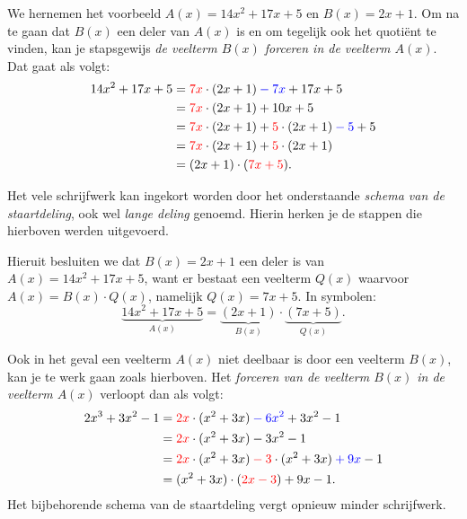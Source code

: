 \documentclass{ximera}
\begin{document}
\begin{algorithm} 
	We hernemen het voorbeeld $A(x) = 14x^2+17x+5$ en $B(x) = 2x+1$. Om na te gaan dat $B(x)$ een deler van $A(x)$ is en om tegelijk ook het quotiënt te vinden, kan je stapsgewijs {\em de veelterm $B(x)$ forceren in de veelterm $A(x)$}. Dat gaat als volgt:
	\begin{align*}
	14x^2 + 17x + 5 
	& = \mathcolor{red}{7x} \cdot (2x+1) \mathcolor{blue}{- 7x} + 17x + 5 \\
	& = \mathcolor{red}{7x} \cdot (2x+1) + 10x + 5 \\
	& = \mathcolor{red}{7x} \cdot (2x+1) + \mathcolor{red}{5} \cdot (2x+1) \mathcolor{blue}{- 5} + 5 \\
	& = \mathcolor{red}{7x} \cdot (2x+1) + \mathcolor{red}{5} \cdot (2x+1) \\
	& = (2x+1)\cdot(\mathcolor{red}{7x + 5}).
	\end{align*}
	
	
	
	Het vele schrijfwerk kan ingekort worden door het onderstaande {\em schema van de staartdeling}, ook wel {\em lange deling} genoemd. Hierin herken je de stappen die hierboven werden uitgevoerd. 


	Hieruit besluiten we dat $B(x) = 2x+1$ een deler is van $A(x) = 14x^2+17x+5$, want er bestaat een veelterm $Q(x)$ waarvoor $A(x) = B(x) \cdot Q(x)$, namelijk $Q(x) = 7x+5$. In symbolen:
	\[
	\underbrace{14x^2+17x+5}_{A(x)} = \underbrace{(2x+1)}_{B(x)}\cdot\underbrace{(7x + 5)}_{Q(x)}.
	\]

	Ook in het geval een veelterm $A(x)$ niet deelbaar is door een veelterm $B(x)$, kan je te werk gaan zoals hierboven. Het {\em forceren van de veelterm $B(x)$ in de veelterm $A(x)$} verloopt dan als volgt:
	\begin{align*}
	2x^3 + 3x^2 - 1 
	& = \mathcolor{red}{2x} \cdot (x^2+3x) \mathcolor{blue}{- 6x^2} + 3x^2 - 1 \\
	& = \mathcolor{red}{2x} \cdot (x^2+3x) - 3x^2 - 1 \\
	& = \mathcolor{red}{2x} \cdot (x^2+3x) \mathcolor{red}{- 3} \cdot (x^2+3x) \mathcolor{blue}{+ 9x} - 1  \\
	& = (x^2+3x) \cdot (\mathcolor{red}{2x - 3}) + 9x - 1.
	\end{align*}
	Het bijbehorende schema van de staartdeling vergt opnieuw minder schrijfwerk. 


\end{algorithm}
\end{document}
